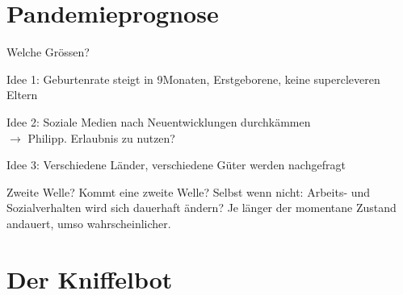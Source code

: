 \documentclass{beamer}
\begin{document}
\section{Pandemieprognose}

\begin{frame}{Welche Gr\"ossen?}

\begin{exampleblock}{Idee 1:}
Geburtenrate steigt in 9Monaten, Erstgeborene, keine supercleveren Eltern
\end{exampleblock}

\begin{exampleblock}{Idee 2:}
Soziale Medien nach Neuentwicklungen durchk\"ammen\\
$\rightarrow$ Philipp. Erlaubnis zu nutzen?
\end{exampleblock}

\begin{exampleblock}{Idee 3:}
Verschiedene L\"ander, verschiedene G\"uter werden nachgefragt
\end{exampleblock}

\begin{alertblock}{Zweite Welle?}
Kommt eine zweite Welle? Selbst wenn nicht: Arbeits- und Sozialverhalten wird sich dauerhaft \"andern? Je l\"anger der momentane Zustand andauert, umso wahrscheinlicher.
\end{alertblock}

\end{frame}


\section{Der Kniffelbot}
\end{document}
